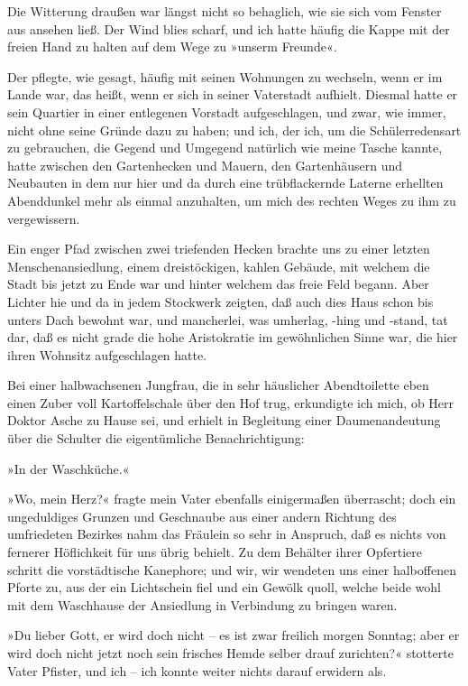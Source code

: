 Die Witterung draußen war längst nicht so behaglich, wie sie sich
vom Fenster aus ansehen ließ. Der Wind blies scharf, und ich hatte
häufig die Kappe mit der freien Hand zu halten auf dem Wege zu
»unserm Freunde«.

Der pflegte, wie gesagt, häufig mit seinen Wohnungen zu wechseln,
wenn er im Lande war, das heißt, wenn er sich in seiner Vaterstadt
aufhielt. Diesmal hatte er sein Quartier in einer entlegenen
Vorstadt aufgeschlagen, und zwar, wie immer, nicht ohne seine
Gründe dazu zu haben; und ich, der ich, um die Schülerredensart zu
gebrauchen, die Gegend und Umgegend natürlich wie meine Tasche
kannte, hatte zwischen den Gartenhecken und Mauern, den
Gartenhäusern und Neubauten in dem nur hier und da durch eine
trübflackernde Laterne erhellten Abenddunkel mehr als einmal
anzuhalten, um mich des rechten Weges zu ihm zu vergewissern.

Ein enger Pfad zwischen zwei triefenden Hecken brachte uns zu einer
letzten Menschenansiedlung, einem dreistöckigen, kahlen Gebäude,
mit welchem die Stadt bis jetzt zu Ende war und hinter welchem das
freie Feld begann. Aber Lichter hie und da in jedem Stockwerk
zeigten, daß auch dies Haus schon bis unters Dach bewohnt war, und
mancherlei, was umherlag, -hing und -stand, tat dar, daß es nicht
grade die hohe Aristokratie im gewöhnlichen Sinne war, die hier
ihren Wohnsitz aufgeschlagen hatte.

Bei einer halbwachsenen Jungfrau, die in sehr häuslicher
Abendtoilette eben einen Zuber voll Kartoffelschale über den Hof
trug, erkundigte ich mich, ob Herr Doktor Asche zu Hause sei, und
erhielt in Begleitung einer Daumenandeutung über die Schulter die
eigentümliche Benachrichtigung:

»In der Waschküche.«

»Wo, mein Herz?« fragte mein Vater ebenfalls einigermaßen
überrascht; doch ein ungeduldiges Grunzen und Geschnaube aus einer
andern Richtung des umfriedeten Bezirkes nahm das Fräulein so sehr
in Anspruch, daß es nichts von fernerer Höflichkeit für uns übrig
behielt. Zu dem Behälter ihrer Opfertiere schritt die vorstädtische
Kanephore; und wir, wir wendeten uns einer halboffenen Pforte zu,
aus der ein Lichtschein fiel und ein Gewölk quoll, welche beide
wohl mit dem Waschhause der Ansiedlung in Verbindung zu bringen
waren.

»Du lieber Gott, er wird doch nicht – es ist zwar freilich morgen
Sonntag; aber er wird doch nicht jetzt noch sein frisches Hemde
selber drauf zurichten?« stotterte Vater Pfister, und ich – ich
konnte weiter nichts darauf erwidern als.

